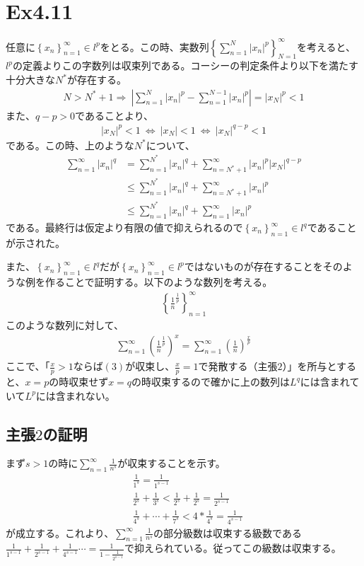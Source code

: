 \documentclass{article}
\begin{document}
\section{Ex4.11}
任意に$\left\{ x_n \right\}_{n = 1}^{\infty} \in l^p$をとる。この時、実数列$\left\{ \sum_{n = 1}^N |x_n|^p \right\}_{N = 1}^{\infty}$を考えると、$l^p$の定義よりこの字数列は収束列である。コーシーの判定条件より以下を満たす十分大きな$N^*$が存在する。
\begin{align*}
	N > N^* + 1 \Rightarrow\ \left| \sum_{n = 1}^N |x_n|^p - \sum_{n = 1}^{N-1} |x_n|^p \right| = |x_N|^p < 1
\end{align*}
また、$q- p > 0$であることより、
\begin{align*}
	|x_N|^p < 1\ \Leftrightarrow\ |x_N| < 1\ \Leftrightarrow\ |x_N|^{q-p} < 1
\end{align*}
である。この時、上のような$N^*$について、
\begin{align*}
	\sum_{n = 1}^{\infty} |x_n|^q &= \sum_{n = 1}^{N^*} |x_n|^q + \sum_{n = N^* +1}^\infty |x_n|^p |x_N|^{q-p}\\
	&\leq \sum_{n = 1}^{N^*} |x_n|^q + \sum_{n = N^* +1}^\infty |x_n|^p\\
	&\leq \sum_{n = 1}^{N^*} |x_n|^q + \sum_{n =1}^\infty |x_n|^p
\end{align*}
である。最終行は仮定より有限の値で抑えられるので$\left\{ x_n \right\}_{n = 1}^{\infty} \in l^q$であることが示された。

また、$\left\{ x_n \right\}_{n = 1}^{\infty} \in l^q$だが$\left\{ x_n \right\}_{n = 1}^{\infty} \in l^p$ではないものが存在することをそのような例を作ることで証明する。以下のような数列を考える。
\begin{align*}
	\left\{ \frac{1}{n}^{\frac{1}{p}} \right\}_{n = 1}^{\infty}
\end{align*}
このような数列に対して、
\begin{align}
	\sum_{n = 1}^{\infty} \left( \frac{1}{n}^{\frac{1}{p}} \right)^{x} = \sum_{n = 1}^{\infty} \left(\frac{1}{n}\right)^{\frac{x}{p}}
\end{align}
ここで、「$\frac{x}{p} > 1$ならば$(3)$が収束し、$\frac{x}{p} = 1$で発散する（主張$2$）」を所与とすると、$x = p$の時収束せず$x = q$の時収束するので確かに上の数列は$L^q$には含まれていて$L^p$には含まれない。

\subsection{主張$2$の証明}
まず$s > 1$の時に$\sum_{n = 1}^{\infty} \frac{1}{n^s}$が収束することを示す。
\begin{align*}
	&\frac{1}{1^s} = \frac{1}{1^{s-1}}\\
	&\frac{1}{2^s} + \frac{1}{3^s} < \frac{1}{2^s} + \frac{1}{2^s} = \frac{1}{2^{s-1}}\\
	&\frac{1}{4^s} + \cdots + \frac{1}{7^s} < 4 * \frac{1}{4^s} = \frac{1}{4^{s-1}}
\end{align*}
が成立する。これより、$\sum_{n = 1}^{\infty} \frac{1}{n^s}$の部分級数は収束する級数である$\frac{1}{1^{s-1}} + \frac{1}{2^{s-1}} + \frac{1}{4^{s-1}} \cdots = \frac{1}{1 - \frac{1}{2^{s-1}}}$で抑えられている。従ってこの級数は収束する。
\end{document}
